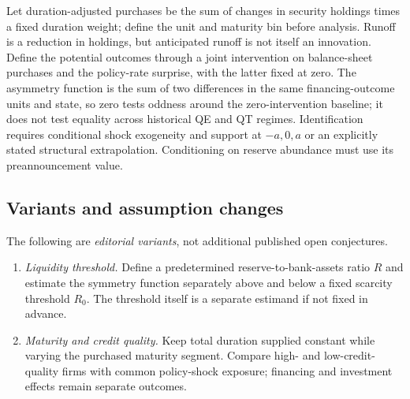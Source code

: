 \documentclass[11pt,a4paper]{article}
\begin{document}
Let duration-adjusted purchases be the sum of changes in security holdings times a fixed duration weight; define the unit and maturity bin before analysis. Runoff is a reduction in holdings, but anticipated runoff is not itself an innovation. Define the potential outcomes through a joint intervention on balance-sheet purchases and the policy-rate surprise, with the latter fixed at zero. The asymmetry function is the sum of two differences in the same financing-outcome units and state, so zero tests oddness around the zero-intervention baseline; it does not test equality across historical QE and QT regimes. Identification requires conditional shock exogeneity and support at \(-a,0,a\) or an explicitly stated structural extrapolation. Conditioning on reserve abundance must use its preannouncement value.
\subsection*{Variants and assumption changes}
The following are \emph{editorial variants}, not additional published open conjectures.
\begin{enumerate}
\item \emph{Liquidity threshold.} Define a predetermined reserve-to-bank-assets ratio \(R\) and estimate the symmetry function separately above and below a fixed scarcity threshold \(R_0\). The threshold itself is a separate estimand if not fixed in advance.
\item \emph{Maturity and credit quality.} Keep total duration supplied constant while varying the purchased maturity segment. Compare high- and low-credit-quality firms with common policy-shock exposure; financing and investment effects remain separate outcomes.
\end{enumerate}
\end{document}
